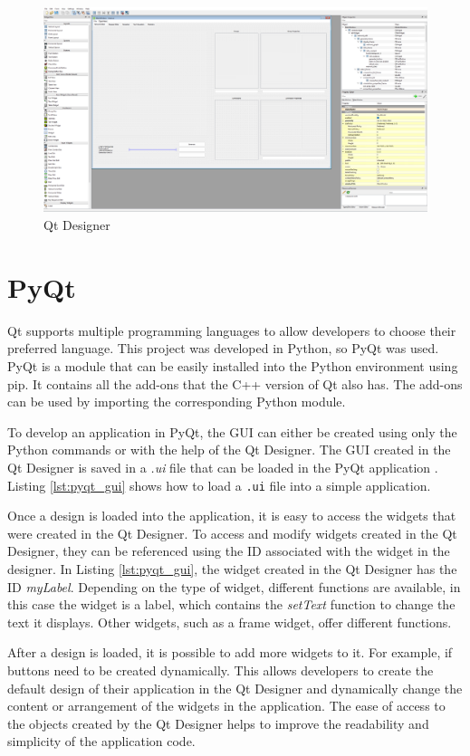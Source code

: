 \begin{figure}
    \centering
    \includegraphics[width=0.8\linewidth]{images/qt_designer.png}
    \caption{Qt Designer}
    \label{fig:qt_designer}
\end{figure}

\section{PyQt}
\label{sub:pyqt}


Qt supports multiple programming languages to allow developers to choose their preferred language. This project was developed in Python, so PyQt was used. PyQt is a module that can be easily installed into the Python environment using pip. It contains all the add-ons that the C++ version of Qt also has. The add-ons can be used by importing the corresponding Python module. 

To develop an application in PyQt, the GUI can either be created using only the Python commands or with the help of the Qt Designer. The GUI created in the Qt Designer is saved in a \textit{.ui} file that can be loaded in the PyQt application \cite{pyqt}. Listing \ref{lst:pyqt_gui} shows how to load a \texttt{.ui} file into a simple application. 

Once a design is loaded into the application, it is easy to access the widgets that were created in the Qt Designer. To access and modify widgets created in the Qt Designer, they can be referenced using the ID associated with the widget in the designer. In Listing \ref{lst:pyqt_gui}, the widget created in the Qt Designer has the ID \textit{myLabel}. Depending on the type of widget, different functions are available, in this case the widget is a label, which contains the \textit{setText} function to change the text it displays. Other widgets, such as a frame widget, offer different functions. 

After a design is loaded, it is possible to add more widgets to it. For example, if buttons need to be created dynamically. This allows developers to create the default design of their application in the Qt Designer and dynamically change the content or arrangement of the widgets in the application. The ease of access to the objects created by the Qt Designer helps to improve the readability and simplicity of the application code.

